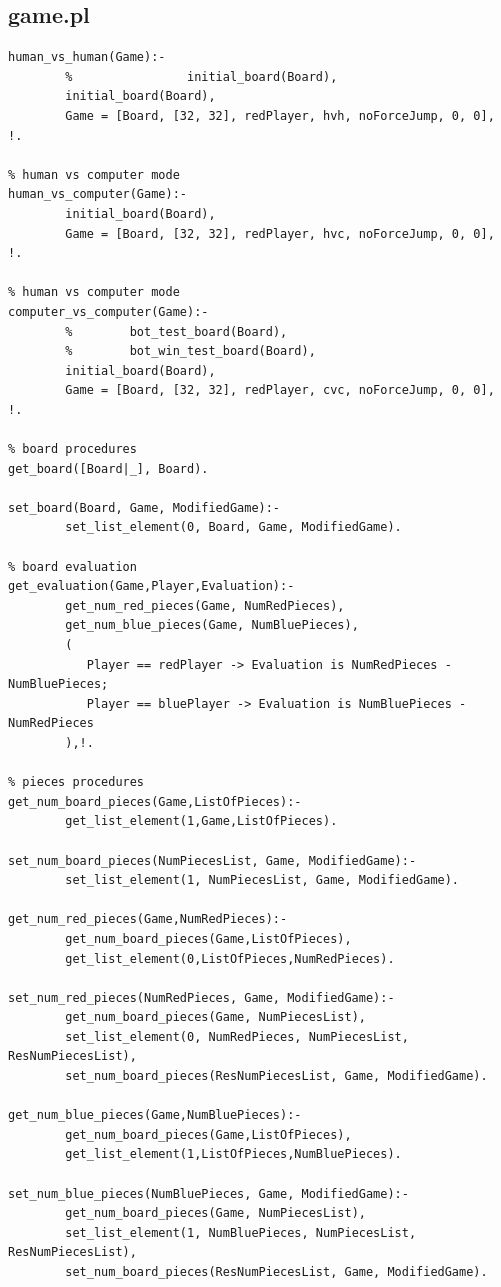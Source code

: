 \documentclass[a4paper]{article}
\begin{document}
\subsection{game.pl}
\begin{lstlisting}[style=customprologwithlines]
% human vs human mode
human_vs_human(Game):-
        %                initial_board(Board),
        initial_board(Board),
        Game = [Board, [32, 32], redPlayer, hvh, noForceJump, 0, 0], !.

% human vs computer mode
human_vs_computer(Game):-
        initial_board(Board),
        Game = [Board, [32, 32], redPlayer, hvc, noForceJump, 0, 0], !.

% human vs computer mode
computer_vs_computer(Game):-
        %        bot_test_board(Board),
        %        bot_win_test_board(Board),
        initial_board(Board),
        Game = [Board, [32, 32], redPlayer, cvc, noForceJump, 0, 0], !.

% board procedures
get_board([Board|_], Board).

set_board(Board, Game, ModifiedGame):-
        set_list_element(0, Board, Game, ModifiedGame).

% board evaluation
get_evaluation(Game,Player,Evaluation):-
        get_num_red_pieces(Game, NumRedPieces),
        get_num_blue_pieces(Game, NumBluePieces),
        (
           Player == redPlayer -> Evaluation is NumRedPieces - NumBluePieces;
           Player == bluePlayer -> Evaluation is NumBluePieces - NumRedPieces
        ),!.

% pieces procedures
get_num_board_pieces(Game,ListOfPieces):-
        get_list_element(1,Game,ListOfPieces).

set_num_board_pieces(NumPiecesList, Game, ModifiedGame):-
        set_list_element(1, NumPiecesList, Game, ModifiedGame).

get_num_red_pieces(Game,NumRedPieces):-
        get_num_board_pieces(Game,ListOfPieces),
        get_list_element(0,ListOfPieces,NumRedPieces).

set_num_red_pieces(NumRedPieces, Game, ModifiedGame):-
        get_num_board_pieces(Game, NumPiecesList),
        set_list_element(0, NumRedPieces, NumPiecesList, ResNumPiecesList),
        set_num_board_pieces(ResNumPiecesList, Game, ModifiedGame).

get_num_blue_pieces(Game,NumBluePieces):-
        get_num_board_pieces(Game,ListOfPieces),
        get_list_element(1,ListOfPieces,NumBluePieces).

set_num_blue_pieces(NumBluePieces, Game, ModifiedGame):-
        get_num_board_pieces(Game, NumPiecesList),
        set_list_element(1, NumBluePieces, NumPiecesList, ResNumPiecesList),
        set_num_board_pieces(ResNumPiecesList, Game, ModifiedGame).


\end{lstlisting}
\end{document}
